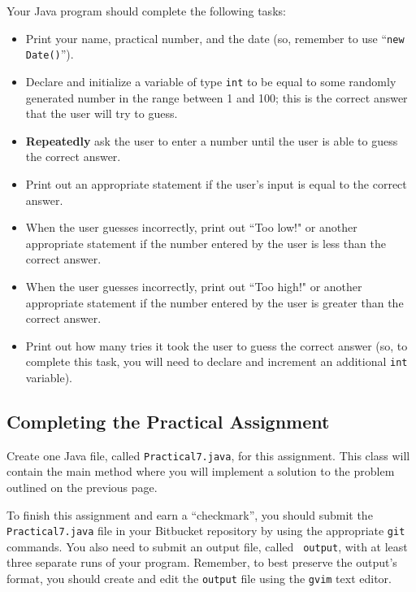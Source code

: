 \noindent
Your Java program should complete the following tasks:

\begin{itemize}

  \item Print your name, practical number, and the date (so, remember to use ``{\tt new Date()}'').

  \item Declare and initialize a variable of type {\tt int} to be equal to some randomly generated number in the range
    between 1 and 100; this is the correct answer that the user will try to guess.

  \item \textbf{Repeatedly} ask the user to enter a number until the user is able to guess the correct answer.

  \item Print out an appropriate statement if the user's input is equal to the correct answer.

  \item When the user guesses incorrectly, print out ``Too low!" or another appropriate statement if the number entered
    by the user is less than the correct answer.

  \item When the user guesses incorrectly, print out ``Too high!" or another appropriate statement if the number entered
    by the user is greater than the correct answer.

  \item Print out how many tries it took the user to guess the correct answer (so, to complete this task, you will need
    to declare and increment an additional {\tt int} variable).

\end{itemize}

\vspace*{-.1in}
\subsection*{Completing the Practical Assignment}

\vspace*{-.1in}

Create one Java file, called {\tt Practical7.java}, for this assignment.  This class will contain the main method where
you will implement a solution to the problem outlined on the previous page.

\noindent To finish this assignment and earn a ``checkmark'', you should submit the {\tt Practical7.java} file in your
Bitbucket repository by using the appropriate {\tt git} commands. You also need to submit an output file, called {\tt
output}, with at least three separate runs of your program. Remember, to best preserve the output's format, you should
create and edit the {\tt output} file using the {\tt gvim} text editor.

